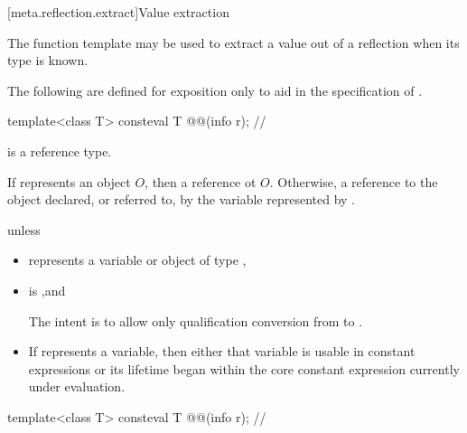 [meta.reflection.extract]{Value extraction}

\pnum
The  function template may be used
to extract a value out of a reflection when its type is known.

\pnum
The following are defined for exposition only
to aid in the specification of .

\begin{itemdecl}
template<class T>
  consteval T @@(info r);      // \expos
\end{itemdecl}

\begin{itemdescr}
\pnum
\begin{note}
 is a reference type.
\end{note}

\pnum
\returns
If  represents an object $O$,
then a reference ot $O$.
Otherwise, a reference to the object declared, or referred to,
by the variable represented by .

\pnum
\throws
{} unless
\begin{itemize}
\item
   represents a variable or object of type ,
\item
  is ,\newline and
  \begin{note}
  The intent is to allow only qualification conversion from  to .
  \end{note}
\item
  If  represents a variable,
  then either that variable is usable in constant expressions
  or its lifetime began within the core constant expression currently under evaluation.
\end{itemize}
\end{itemdescr}

\begin{itemdecl}
template<class T>
  consteval T @@(info r);       // \expos
\end{itemdecl}

